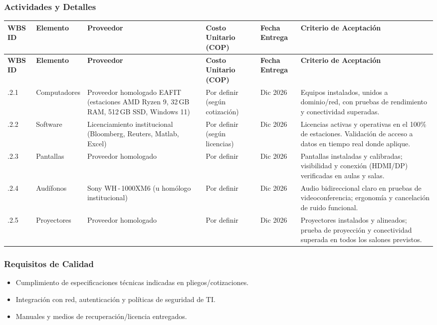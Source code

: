 \subsubsection*{Actividades y Detalles}

\begin{longtable}{|>{\raggedright\arraybackslash}p{1.6cm}|
                        >{\raggedright\arraybackslash}p{1.8cm}|
                        >{\raggedright\arraybackslash}p{2.2cm}|
                        >{\raggedright\arraybackslash}p{2.8cm}|
                        >{\raggedright\arraybackslash}p{2.2cm}|
                        >{\raggedright\arraybackslash}p{4.4cm}|}
\hline
\textbf{WBS ID} & \textbf{Elemento} & \textbf{Proveedor} & \textbf{Costo Unitario (COP)} & \textbf{Fecha Entrega} & \parbox{5.0cm}{\centering\textbf{Criterio de Aceptación}} \\
\hline
\endfirsthead
\hline
\textbf{WBS ID} & \textbf{Elemento} & \textbf{Proveedor} & \textbf{Costo Unitario (COP)} & \textbf{Fecha Entrega} & \parbox{5.0cm}{\centering\textbf{Criterio de Aceptación}} \\
\hline
{}.2.1 & Computadores &
Proveedor homologado EAFIT (estaciones AMD Ryzen 9, 32\,GB RAM, 512\,GB SSD, Windows 11) &
Por definir (según cotización) & 05 Dic 2026 &
Equipos instalados, unidos a dominio/red, con pruebas de rendimiento y conectividad superadas. \\
.2.2 & Software &
Licenciamiento institucional (Bloomberg, Reuters, Matlab, Excel) &
Por definir (según licencias) & 08 Dic 2026 &
Licencias activas y operativas en el 100\% de estaciones. Validación de acceso a datos en tiempo real donde aplique. \\
.2.3 & Pantallas &
Proveedor homologado & Por definir & 12 Dic 2026 &
Pantallas instaladas y calibradas; visibilidad y conexión (HDMI/DP) verificadas en aulas y salas. \\
.2.4 & Audífonos &
Sony WH\,-\,1000XM6 (u homólogo institucional) &
Por definir & 12 Dic 2026 &
Audio bidireccional claro en pruebas de videoconferencia; ergonomía y cancelación de ruido funcional. \\
.2.5 & Proyectores &
Proveedor homologado & Por definir & 15 Dic 2026 &
Proyectores instalados y alineados; prueba de proyección y conectividad superada en todos los salones previstos. \\
\hline
\end{longtable}

\subsubsection*{Requisitos de Calidad}
\begin{itemize}
    \item Cumplimiento de especificaciones técnicas indicadas en pliegos/cotizaciones.
    \item Integración con red, autenticación y políticas de seguridad de TI.
    \item Manuales y medios de recuperación/licencia entregados.
\end{itemize}

